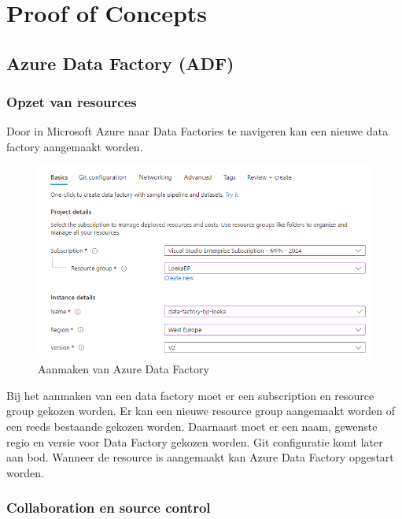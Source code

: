 \chapter{Proof of Concepts}%
\label{ch:proof-of-concepts}

\section{Azure Data Factory (ADF)}

\subsection{Opzet van resources}

Door in Microsoft Azure naar Data Factories te navigeren kan een nieuwe data factory aangemaakt worden.

\begin{figure}[H]
    \centering
    \includegraphics[width=1\textwidth]{./graphics/adf/initial_create.png}
    \caption{Aanmaken van Azure Data Factory}
\end{figure}

Bij het aanmaken van een data factory moet er een subscription en resource group gekozen worden. Er kan een nieuwe resource group aangemaakt worden of een reeds bestaande gekozen worden. Daarnaast moet er een naam, gewenste regio en versie voor Data Factory gekozen worden. Git configuratie komt later aan bod. Wanneer de resource is aangemaakt kan Azure Data Factory opgestart worden.

\subsection{Collaboration en source control}
\label{sec:adf-git}

